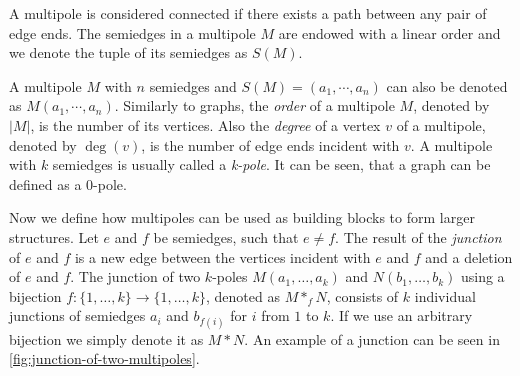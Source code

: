 \documentclass[12pt, twoside]{book}
\begin{document}
A multipole is considered connected if there exists a path between any pair of edge ends. The semiedges in a multipole $M$ are endowed with a linear order and we denote the tuple of its semiedges as $S(M)$.

A multipole $M$ with $n$ semiedges and $S(M) = (a_1, \cdots, a_n)$ can also be denoted as $M(a_1,\cdots,a_n)$. Similarly to graphs, the \textit{order} of a multipole $M$, denoted by $|M|$, is the number of its vertices. Also the \textit{degree} of a vertex $v$ of a multipole, denoted by $\deg(v)$, is the number of edge ends incident with $v$. A multipole with $k$ semiedges is usually called a \textit{k-pole}. It can be seen, that a graph can be defined as a 0-pole.

Now we define how multipoles can be used as building blocks to form larger structures. Let $e$ and $f$ be semiedges, such that $e\neq f$. The result of the \textit{junction} of $e$ and $f$ is a new edge between the vertices incident with $e$ and $f$ and a deletion of $e$ and $f$. The junction of two $k$-poles $M(a_1,\dots,a_k)$ and $N(b_1,\dots,b_k)$ using a bijection ${f:\{1,\dots,k\}\rightarrow\{1,\dots,k\}}$, denoted as $M*_fN$, consists of $k$ individual junctions of semiedges $a_i$ and $b_{f(i)}$ for $i$ from $1$ to $k$. If we use an arbitrary bijection we simply denote it as $M*N$. An example of a junction can be seen in \cref{fig:junction-of-two-multipoles}.
\end{document}
